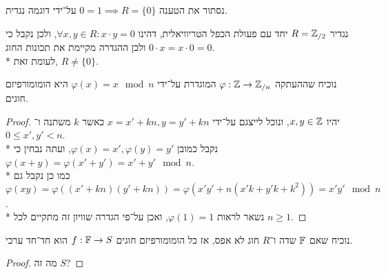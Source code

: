 \Subquestion{}
נסתור את הטענה $0 = 1 \implies R = \{ 0 \}$ על־ידי דוגמה נגדית.

נגדיר $R = \mathbb{Z}_{/2}$ יחד עם פעולת הכפל הטריוויאלית, דהינו $\forall x, y \in R : x \cdot y = 0$, ולכן נקבל כי $0 \cdot x = x \cdot 0 = 0$ ולכן ההגדרה מקיימת את תכונות החוג. \\*
לעומת זאת, $R \ne \{ 0 \}$.

\Question{}
\Subquestion{}
נוכיח שההעתקה $\varphi : \mathbb{Z} \to \mathbb{Z}_{/n}$ המוגדרת על־ידי $\varphi(x) = x \mod n$ היא הומומורפיזם חוגים.
\begin{proof}
	יהיו $x, y \in \mathbb{Z}$, ונוכל לייצגם על־ידי $x = x' + k n, y = y' + k n$ כאשר $k$ משתנה ו־$0 \le x', y' < n$. \\*
	נקבל כמובן $\varphi(x) = x', \varphi(y) = y'$, ועתה נבחין כי $\varphi(x + y) = \varphi(x' + y') = x' + y' \mod n$. \\*
	כמו כן נקבל גם $\varphi(x y) = \varphi((x' + kn)(y' + kn)) = \varphi(x' y' + n(x'k + y'k + k^2)) = x' y' \mod n$. \\*
	נשאר לראות $\varphi(1) = 1$, ואכן על־פי הגדרה שוויון זה מתקיים לכל $n \ge 1$.
\end{proof}

\Subquestion{}
נוכיח שאם $\mathbb{F}$ שדה ו־$R$ חוג לא אפס, אז כל הומומורפיזם חוגים $f : \mathbb{F} \to S$ הוא חד־חד ערכי.
\begin{proof}
	מה זה $S$?
\end{proof}

